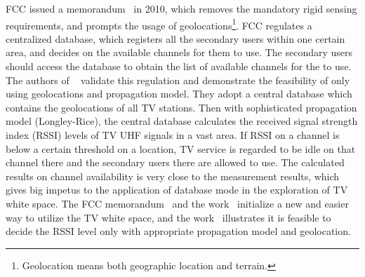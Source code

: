 \documentclass[times]{ettauth}
\theoremstyle{mytheoremstyle}
\theoremstyle{mytheoremstyle}
\theoremstyle{mytheoremstyle}
\begin{document}
FCC issued a memorandum~\cite{FCC_2010_sedond_memorandumm,FCCdatabasae} in 2010, which removes the mandatory rigid sensing requirements, and prompts the usage of geolocations\footnote{Geolocation means both geographic location and terrain.}.
FCC regulates a centralized database, which registers all the secondary users within one certain area, and decides on the available channels for them to use.
The secondary users should access the database to obtain the list of available channels for the to use.
The authors of ~\cite{SenseLess2011} validate this regulation and demonstrate the feasibility of only using geolocations and  propagation model.
They adopt a central database which contains the geolocations of all TV stations.
Then with sophisticated propagation model (Longley-Rice), the central database calculates the received signal strength index (RSSI) levels of TV UHF signals in a vast area.
If RSSI on a channel is below a certain threshold on a location, TV service is regarded to be idle on that channel there and the secondary users there are allowed to use.
The calculated results on channel availability is very close to the measurement results, which gives big impetus to the application of database mode in the exploration of TV white space.
%
The FCC memorandum~\cite{FCC_2010_sedond_memorandumm,FCCdatabasae} and the work~\cite{SenseLess2011} initialize a new and easier way to utilize the TV white space, and the work~\cite{SenseLess2011} illustrates it is feasible to decide the RSSI level only with appropriate propagation model and geolocation.
\end{document}
